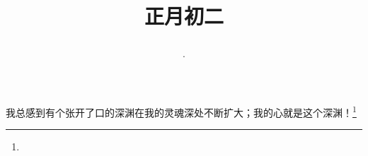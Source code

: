 \title{\date[d=11,m=2,y=2024][year:cn-y,年,month:cn,day:cn,日,·,weekday]·正月初二 }
我总感到有个张开了口的深渊在我的灵魂深处不断扩大；我的心就是这个深渊！\footnote{ }

